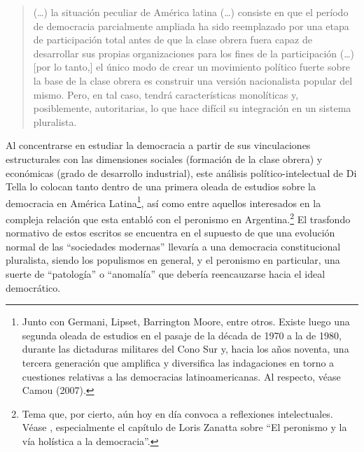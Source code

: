 \begin{quote}
(\dots) la situación peculiar de América latina (\dots) consiste en que el período de democracia parcialmente ampliada ha sido reemplazado por una etapa de participación total antes de que la clase obrera fuera capaz de desarrollar sus propias organizaciones para los fines de la participación (\dots) [por lo tanto,] el único modo de crear un movimiento político fuerte sobre la base de la clase obrera es construir una versión nacionalista popular del mismo. Pero, en tal caso, tendrá características monolíticas y, posiblemente, autoritarias, lo que hace difícil su integración en un sistema pluralista.
\end{quote}

Al concentrarse en estudiar la democracia a partir de sus vinculaciones estructurales con las dimensiones sociales (formación de la clase obrera) y económicas (grado de desarrollo industrial), este análisis político-intelectual de Di Tella lo colocan tanto dentro de una primera oleada de estudios sobre la democracia en América Latina\footnote{Junto con Germani, Lipset, Barrington Moore, entre otros. Existe luego una segunda oleada de estudios en el pasaje de la década de 1970 a la de 1980, durante las dictaduras militares del Cono Sur y, hacia los años noventa, una tercera generación que amplifica y diversifica las indagaciones en torno a cuestiones relativas a las democracias latinoamericanas. Al respecto, véase Camou (2007).}, así como entre aquellos interesados en la compleja relación que esta entabló con el peronismo en Argentina.\footnote{Tema que, por cierto, aún hoy en día convoca a reflexiones intelectuales. Véase \textcite{1543-NOVARO2014}, especialmente el capítulo de Loris Zanatta sobre \enquote{El peronismo y la vía holística a la democracia}.} El trasfondo normativo de estos escritos se encuentra en el supuesto de que una evolución normal de las \enquote{sociedades modernas} llevaría a una democracia constitucional pluralista, siendo los populismos en general, y el peronismo en particular, una suerte de \enquote{patología} o \enquote{anomalía} que debería reencauzarse hacia el ideal democrático.

